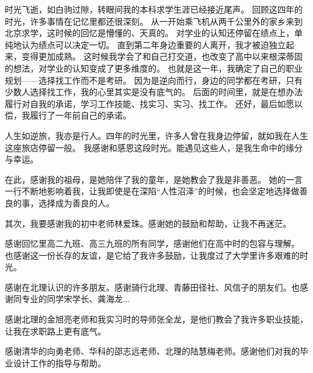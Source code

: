 %
%
%
%
%
%

\renewcommand{\thechapter}{致谢}



时光飞逝，如白驹过隙，转眼间我的本科求学生涯已经接近尾声。
回顾这四年的时光，许多事情在记忆里都还很深刻。
从一开始乘飞机从两千公里外的家乡来到北京求学，这时候的回忆是懵懂的、天真的。
对学业的认知还停留在绩点上，单纯地认为绩点可以决定一切。
直到第二年身边重要的人离开，我才被迫独立起来，变得更加成熟。
这时候我学会了和自己打交道，也改变了高中以来根深蒂固的想法，对学业的认知变成了更多维度的。
也就是这一年，我确定了自己的职业规划——选择找工作而不是考研。
因为是逆向而行，身边的同学都在考研，只有少数人选择找工作，我的心里其实是没有底气的。
后面的时间里，就是在想办法履行对自我的承诺，学习工作技能、找实习、实习、找工作。
还好，最后如愿以偿，我履行了一年前自己的承诺。

人生如逆旅，我亦是行人。四年的时光里，许多人曾在我身边停留，就如我在人生这座旅店停留一般。
我感谢和感恩这段时光。能遇见这些人，是我生命中的缘分与幸运。

在此，感谢我的祖母，是她陪伴了我的童年，是她教会了我是非善恶。
她的一言一行不断地影响着我，让我即使是在深陷“人性沼泽”的时候，也会坚定地选择做善良的事，选择成为善良的人。

其次，我要感谢我的初中老师林爱珠。感谢她的鼓励和帮助，让我不再迷茫。

感谢回忆里高二九班、高三九班的所有同学，感谢他们在高中时的包容与理解。
也感谢这一份长存的友谊，是它给了我许多鼓励，让我度过了大学里许多艰难的时光。

感谢在北理认识的许多朋友。感谢骑行北理、青藤田径社、风信子的朋友们。也感谢同专业的同学宋学长、龚海龙...

感谢北理的金旭亮老师和我实习时的导师张全龙，是他们教会了我许多职业技能，让我在求职路上更有底气。

感谢清华的向勇老师、华科的邵志远老师、北理的陆慧梅老师。感谢他们对我的毕业设计工作的指导与帮助。


